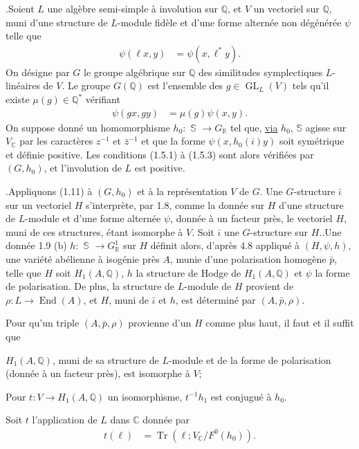 \documentclass[10pt]{article}
\newcommand{\C}{\mathbb C}
\newcommand{\Q}{\mathbb Q}
\newcommand{\R}{\mathbb R}
\newcommand{\bS}{\mathbb S}
\newcommand{\GL}{\operatorname{GL}}
\newcommand{\End}{\operatorname{End}}
\newcommand{\Tr}{\operatorname{Tr}}
\begin{document}
.\quad Soient $L$ une algèbre semi-simple à involution sur $\Q$, et $V$ un vectoriel sur $\Q$, muni d'une structure de $L$-module fidèle et d'une forme alternée non dégénérée $\psi$ telle que
\begingroup
\makeatletter
\tagsleft@true
\makeatother
\begin{align}
\psi(\ell x,y)&=\psi(x,\ell^*y).\tag{4.9.1}
\end{align}
On désigne par $G$ le groupe algébrique sur $\Q$ des similitudes symplectiques $L$-linéaires de $V$. Le groupe $G(\Q)$ est l'ensemble des $g\in\GL_L(V)$ tels qu'il existe $\mu(g)\in\Q^*$ vérifiant
\begin{align}
\psi(gx,gy)&=\mu(g)\psi(x,y).\tag{4.9.2}
\end{align}
\endgroup
On suppose donné un homomorphisme $h_0:$ \uline{$\bS$} $\longrightarrow G_\R$ tel que, \uline{via} $h_0$, \uline{$\bS$} agisse sur $V_\C$ par les caractères $z^{-1}$ et $\bar z^{-1}$ et que la forme $\psi(x,h_0(i)y)$ soit symétrique et définie positive. Les conditions (1.5.1) à (1.5.3) sont alors vérifiées par $(G,h_0)$, et l'involution de $L$ est positive.

.\quad Appliquons (1.11) à $(G,h_0)$ et à la représentation $V$ de $G$. Une $G$-structure $\bar\iota$ sur un vectoriel $H$ s'interprète, par 1.8, comme la donnée sur $H$ d'une structure de $L$-module et d'une forme alternée $\psi$, donnée à un facteur près, le vectoriel $H$, muni de ces structures, étant isomorphe à $V$. Soit $\bar\iota$ une $G$-structure sur $H$..Une donnée 1.9 (b) $h:$ \uline{$\bS$} $\longrightarrow G^1_\R$ sur $H$ définit alors, d'après 4.8 appliqué à $(H,\psi,h)$, une variété abélienne à isogénie près $A$, munie d'une polarisation homogène $\bar p$, telle que $H$ soit $H_1(A,\Q)$, $h$ la structure de Hodge de $H_1(A,\Q)$ et $\psi$ la forme de polarisation. De plus, la structure de $L$-module de $H$ provient de $\rho:L\longrightarrow\End(A)$, et $H$, muni de $\bar\iota$ et $h$, est déterminé par $(A,\bar p,\rho)$.

Pour qu'un triple $(A,\bar p,\rho)$ provienne d'un $H$ comme plus haut, il faut et il suffit que
\begin{list}{}{\setlength{\leftmargin}{6.4em}\setlength{\labelwidth}{5.4em}\setlength{\labelsep}{1em}\setlength{\topsep}{.4em}\setlength{\itemsep}{0pt}}
\item[(4.10.1)] $H_1(A,\Q)$, muni de sa structure de $L$-module et de la forme de polarisation (donnée à un facteur près), est isomorphe à $V$;
\end{list}
\begin{list}{}{\setlength{\leftmargin}{6.4em}\setlength{\labelwidth}{5.4em}\setlength{\labelsep}{1em}\setlength{\topsep}{.4em}\setlength{\itemsep}{0pt}}
\item[(4.10.2)] Pour $t:V\longrightarrow H_1(A,\Q)$ un isomorphisme, $t^{-1}h_1$ est conjugué à $h_0$.
\end{list}
Soit $t$ l'application de $L$ dans $\C$ donnée par
\begingroup
\makeatletter
\tagsleft@true
\makeatother
\begin{align}
t(\ell)&=\Tr(\ell;V_\C/F^0(h_0)).\tag{4.10.3}
\end{align}
\endgroup
\end{document}
